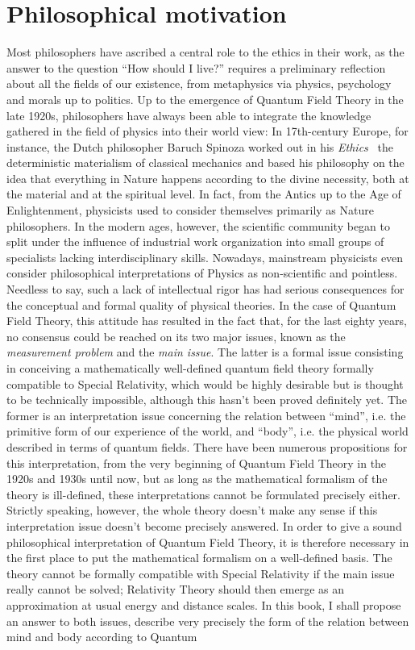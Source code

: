 \documentclass[10pt,a4paper,twoside,openany]{book}
\begin{document}
\section*{Philosophical motivation}

Most philosophers have ascribed a central role to the ethics in their work, as the answer to the question ``How should I live?'' requires a preliminary reflection about all the fields of our existence, from metaphysics via physics, psychology and morals up to politics. Up to the emergence of Quantum Field Theory in the late 1920s, philosophers have always been able to integrate the knowledge gathered in the field of physics into their world view: In 17th-century Europe, for instance, the Dutch philosopher Baruch Spinoza worked out in his \textit{Ethics}~\cite{Spinoza1677} the deterministic materialism of classical mechanics and based his philosophy on the idea that everything in Nature happens according to the divine necessity, both at the material and at the spiritual level. In fact, from the Antics up to the Age of Enlightenment, physicists used to consider themselves primarily as Nature philosophers. In the modern ages, however, the scientific community began to split under the influence of industrial work organization into small groups of specialists lacking interdisciplinary skills. Nowadays, mainstream physicists even consider philosophical interpretations of Physics as non-scientific and pointless. Needless to say, such a lack of intellectual rigor has had serious consequences for the conceptual and formal quality of physical theories. In the case of Quantum Field Theory, this attitude has resulted in the fact that, for the last eighty years, no consensus could be reached on its two major issues, known as the \textit{measurement problem} and the \textit{main issue}. The latter is a formal issue consisting in conceiving a mathematically well-defined quantum field theory formally compatible to Special Relativity\footnotemark[1], which would be highly desirable but is thought to be technically impossible, although this hasn't been proved definitely yet. The former is an interpretation issue concerning the relation between ``mind'', i.e. the primitive form of our experience of the world, and ``body'', i.e. the physical world described in terms of quantum fields. There have been numerous propositions for this interpretation, from the very beginning of Quantum Field Theory in the 1920s and 1930s until now, but as long as the mathematical formalism of the theory is ill-defined, these interpretations cannot be formulated precisely either. Strictly speaking, however, the whole theory doesn't make any sense if this interpretation issue doesn't become precisely answered. In order to give a sound philosophical interpretation of Quantum Field Theory, it is therefore necessary in the first place to put the mathematical formalism on a well-defined basis. The theory cannot be formally compatible with Special Relativity if the main issue really cannot be solved; Relativity Theory should then emerge as an approximation at usual energy and distance scales. In this book, I shall propose an answer to both issues, describe very precisely the form of the relation between mind and body according to Quantum 
\end{document}
